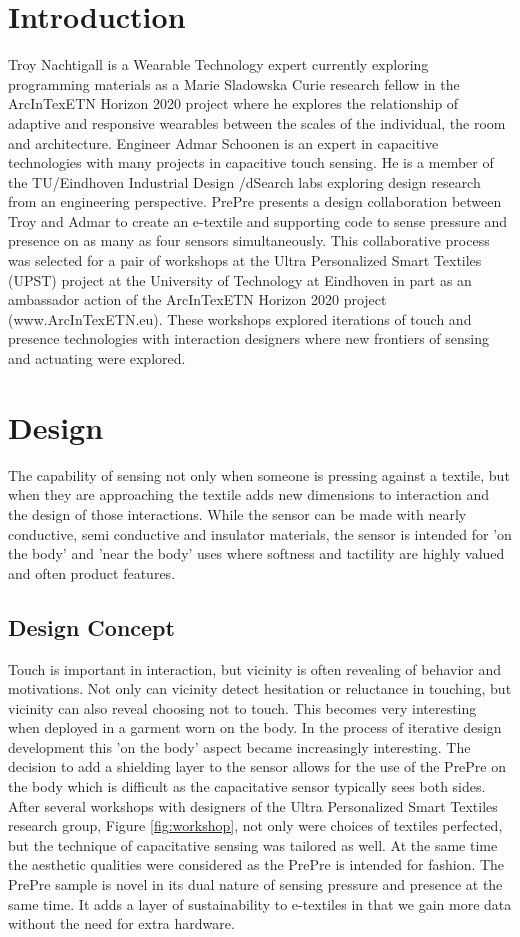 \documentclass{sigchi-ext}
\begin{document}
\section{Introduction}
Troy Nachtigall is a Wearable Technology expert currently exploring programming materials as a Marie Sladowska Curie research fellow in the ArcInTexETN Horizon 2020 project where he explores the relationship of adaptive and responsive wearables between the scales of the individual, the room and architecture. Engineer Admar Schoonen is an expert in capacitive technologies with many projects in capacitive touch sensing.  He is a member of the TU/Eindhoven Industrial Design /dSearch labs exploring design research from an engineering perspective.  PrePre presents a design collaboration between Troy and Admar to create an e-textile and supporting code to sense pressure and  presence on as many as four sensors simultaneously.  This collaborative process was selected for a pair of workshops at the Ultra Personalized Smart Textiles (UPST) project at the University of Technology at Eindhoven in part as an ambassador action of the ArcInTexETN Horizon 2020 project (www.ArcInTexETN.eu). These workshops explored iterations of touch and presence technologies with interaction designers where new frontiers of sensing and actuating were explored.  
\section{Design}
The capability of sensing not only when someone is pressing against a textile, but when they are approaching the textile adds new dimensions to interaction and the design of those interactions.  While the sensor can be made with nearly conductive, semi conductive and insulator materials, the sensor is intended for 'on the body' and 'near the body' uses where softness and tactility are highly valued and often product features. 
\subsection{Design Concept}
Touch is important in interaction, but vicinity is often revealing of behavior and motivations.  Not only can vicinity detect hesitation or reluctance in touching, but vicinity can also reveal choosing not to touch. This becomes very interesting when deployed in a garment worn on the body. In the process of iterative design development this 'on the body' aspect became increasingly interesting. The decision to add a shielding layer to the sensor allows for the use of the PrePre on the body which is difficult as the capacitative sensor typically sees both sides. After several workshops with designers of the Ultra Personalized Smart Textiles research group, Figure \ref{fig:workshop}, not only were choices of textiles perfected, but the technique of capacitative sensing was tailored as well. At the same time the aesthetic qualities were considered as the PrePre is intended for fashion. The PrePre sample is novel in its dual nature of sensing pressure and presence at the same time.  It adds a layer of sustainability to e-textiles in that we gain more data without the need for extra hardware.  
\end{document}
